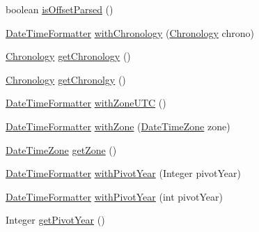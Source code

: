 \begin{DoxyCompactItemize}
\item 
boolean \hyperlink{classorg_1_1joda_1_1time_1_1format_1_1_date_time_formatter_a6455b7cabd195807c685e4d2e2568728}{is\-Offset\-Parsed} ()
\item 
\hyperlink{classorg_1_1joda_1_1time_1_1format_1_1_date_time_formatter}{Date\-Time\-Formatter} \hyperlink{classorg_1_1joda_1_1time_1_1format_1_1_date_time_formatter_a8a09e9172eb85866ffd62379cbf0e6ba}{with\-Chronology} (\hyperlink{classorg_1_1joda_1_1time_1_1_chronology}{Chronology} chrono)
\item 
\hyperlink{classorg_1_1joda_1_1time_1_1_chronology}{Chronology} \hyperlink{classorg_1_1joda_1_1time_1_1format_1_1_date_time_formatter_a274a9d51fa7095c697beefe98ebb968e}{get\-Chronology} ()
\item 
\hyperlink{classorg_1_1joda_1_1time_1_1_chronology}{Chronology} \hyperlink{classorg_1_1joda_1_1time_1_1format_1_1_date_time_formatter_aa5fa0eeee98a5397d042a07076f6c2f6}{get\-Chronolgy} ()
\item 
\hyperlink{classorg_1_1joda_1_1time_1_1format_1_1_date_time_formatter}{Date\-Time\-Formatter} \hyperlink{classorg_1_1joda_1_1time_1_1format_1_1_date_time_formatter_a5e6b8bd8303436bf3739999c660e3b9a}{with\-Zone\-U\-T\-C} ()
\item 
\hyperlink{classorg_1_1joda_1_1time_1_1format_1_1_date_time_formatter}{Date\-Time\-Formatter} \hyperlink{classorg_1_1joda_1_1time_1_1format_1_1_date_time_formatter_ad41dd94d1554f1cf04f93b1a1df4d31d}{with\-Zone} (\hyperlink{classorg_1_1joda_1_1time_1_1_date_time_zone}{Date\-Time\-Zone} zone)
\item 
\hyperlink{classorg_1_1joda_1_1time_1_1_date_time_zone}{Date\-Time\-Zone} \hyperlink{classorg_1_1joda_1_1time_1_1format_1_1_date_time_formatter_a857d9179c38eff40456fc4139641f58a}{get\-Zone} ()
\item 
\hyperlink{classorg_1_1joda_1_1time_1_1format_1_1_date_time_formatter}{Date\-Time\-Formatter} \hyperlink{classorg_1_1joda_1_1time_1_1format_1_1_date_time_formatter_a0db8d3119fcb7fc3fea61b0907a24105}{with\-Pivot\-Year} (Integer pivot\-Year)
\item 
\hyperlink{classorg_1_1joda_1_1time_1_1format_1_1_date_time_formatter}{Date\-Time\-Formatter} \hyperlink{classorg_1_1joda_1_1time_1_1format_1_1_date_time_formatter_a19a3eb2509505116c67af33d8318214a}{with\-Pivot\-Year} (int pivot\-Year)
\item 
Integer \hyperlink{classorg_1_1joda_1_1time_1_1format_1_1_date_time_formatter_a10201d0efb15cf10cbed1e784809dbbb}{get\-Pivot\-Year} ()
\item 

\end{DoxyCompactItemize}
